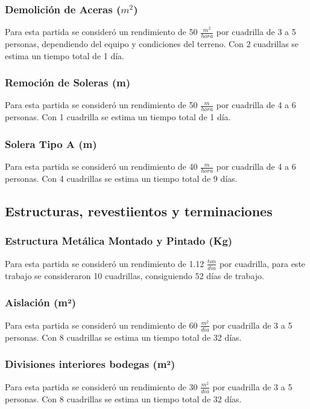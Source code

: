 \documentclass{article} %
\begin{document}
\subsubsection{Demolición de Aceras ($m^2$)}

Para esta partida se consideró un rendimiento de 50 $\frac{m^2}{hora}$ por cuadrilla de 3 a 5 personas, dependiendo del equipo y condiciones del terreno. Con 2 cuadrillas se estima un tiempo total de 1 día.

\subsubsection{Remoción de Soleras (m)}

Para esta partida se consideró un rendimiento de 50 $\frac{m}{hora}$ por cuadrilla de 4 a 6 personas. Con 1 cuadrilla se estima un tiempo total de 1 día.

\subsubsection{Solera Tipo A (m)}

Para esta partida se consideró un rendimiento de 40 $\frac{m}{hora}$ por cuadrilla de 4 a 6 personas. Con 4 cuadrillas se estima un tiempo total de 9 días.

\subsection{Estructuras, revestiientos y terminaciones}

\subsubsection{Estructura Metálica Montado y Pintado (Kg)}
Para esta partida se consideró un rendimiento de 1.12 $\frac{ton}{dia}$ por cuadrilla, para este trabajo se consideraron 10 cuadrillas, consiguiendo 52 días de trabajo.

\subsubsection{Aislación (m²)}
Para esta partida se consideró un rendimiento de 60 $\frac{m^2}{dia}$ por cuadrilla de 3 a 5 personas. Con 8 cuadrillas se estima un tiempo total de 32 días.

\subsubsection{Divisiones interiores bodegas (m²)}
Para esta partida se consideró un rendimiento de 30 $\frac{m^2}{dia}$ por cuadrilla de 3 a 5 personas. Con 8 cuadrillas se estima un tiempo total de 32 días.
\end{document}
